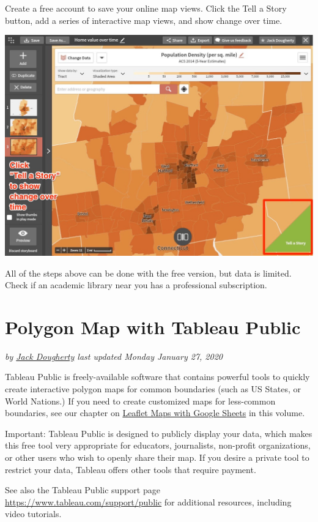\documentclass[
  english,
]{book}
\begin{document}
Create a free account to save your online map views. Click the Tell a Story button, add a series of interactive map views, and show change over time.

\includegraphics{images/06-map/SE-tell-a-story.png}

All of the steps above can be done with the free version, but data is limited. Check if an academic library near you has a professional subscription.

\hypertarget{tableau-polygon}{%
\section{Polygon Map with Tableau Public}\label{tableau-polygon}}

\emph{by \href{authors}{Jack Dougherty} last updated Monday January 27, 2020}

Tableau Public is freely-available software that contains powerful tools to quickly create interactive polygon maps for common boundaries (such as US States, or World Nations.) If you need to create customized maps for less-common boundaries, see our chapter on \href{leaflet-maps-with-google-sheets}{Leaflet Maps with Google Sheets} in this volume.

Important: Tableau Public is designed to publicly display your data, which makes this free tool very appropriate for educators, journalists, non-profit organizations, or other users who wish to openly share their map. If you desire a private tool to restrict your data, Tableau offers other tools that require payment.

See also the Tableau Public support page \url{https://www.tableau.com/support/public} for additional resources, including video tutorials.
\end{document}
